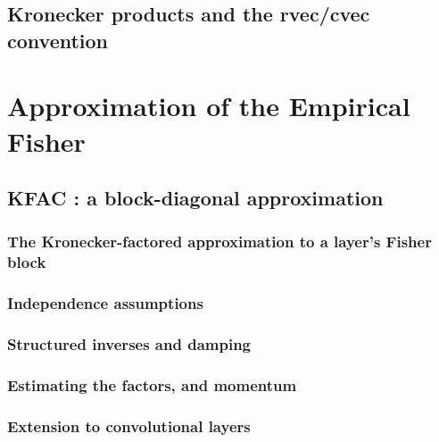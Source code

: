 \documentclass[11pt]{report}
\numberwithin{equation}{chapter}
\theoremstyle{plain}
\theoremstyle{remark}
\begin{document}
\section{Kronecker products and the rvec/cvec convention}
\mbox{}\par

\chapter{Approximation of the Empirical Fisher}
\section{KFAC : a block-diagonal approximation}
\mbox{}\par

\subsection{The Kronecker-factored approximation to a layer's Fisher block}
\mbox{}\par

\subsection{Independence assumptions}
\mbox{}\par

\subsection{Structured inverses and damping}
\mbox{}\par

\subsection{Estimating the factors, and momentum}
\mbox{}\par

\subsection{Extension to convolutional layers}
\mbox{}\par
\end{document}
